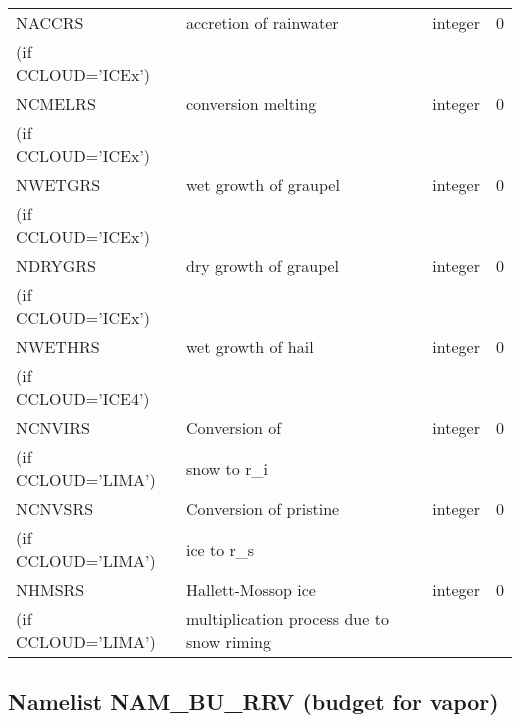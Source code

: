 \begin{center}
\begin{tabular} {|p{8cm}|p{4cm}|>{\centering}p{1.5cm}|p{1.5cm}<{\centering}|}
NACCRS   & accretion of rainwater  & integer  &  0 \index{NACCRS!\innam{NAM\_BU\_RRS}}\\
(if CCLOUD='ICEx') & &   &  \\\hline
NCMELRS  & conversion melting     & integer  &  0 \index{NCMELRS!\innam{NAM\_BU\_RRS}}\\
(if CCLOUD='ICEx') & &   &  \\\hline
NWETGRS  & wet growth of graupel   & integer  &  0 \index{NWETGRS!\innam{NAM\_BU\_RRS}}\\
(if CCLOUD='ICEx') & &   &  \\\hline
NDRYGRS  & dry growth of graupel   & integer  &  0 \index{NDRYGRS!\innam{NAM\_BU\_RRS}}\\
(if CCLOUD='ICEx') & &   &  \\\hline
NWETHRS  & wet growth of hail  & integer  &  0 \index{NWETHRS!\innam{NAM\_BU\_RRS}}\\
(if CCLOUD='ICE4') & &   &  \\\hline
NCNVIRS  &Conversion of    & integer  &  0 \index{NCNVIRS!\innam{NAM\_BU\_RRS}}\\
(if CCLOUD='LIMA') & snow to r\_i&   &  \\\hline
NCNVSRS  & Conversion of pristine  & integer  &  0 \index{NCNVSRS!\innam{NAM\_BU\_RRS}}\\
(if CCLOUD='LIMA') & ice to r\_s &   &  \\\hline
NHMSRS  &Hallett-Mossop ice  & integer  &  0 \index{NHMSRS!\innam{NAM\_BU\_RRS}}\\
(if CCLOUD='LIMA') & multiplication process due to snow riming &   &  \\\hline
\end{tabular}
\end{center}
\subsection{Namelist NAM\_BU\_RRV (budget for  vapor)}

